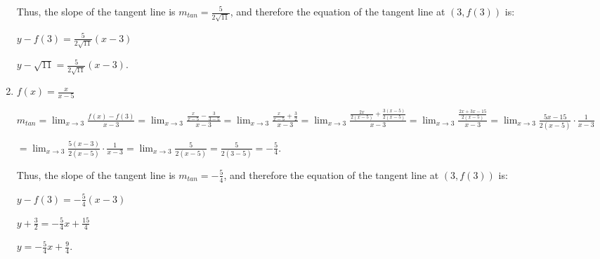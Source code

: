 \documentclass[nooutcomes]{ximera}
\begin{document}
\begin{problem}
\begin{enumerate}
\begin{freeResponse}
		Thus, the slope of the tangent line is $m_{tan}=\frac{5}{2\sqrt{11}}$, and therefore the equation of the tangent line at $(3, f(3))$ is:
		
		$y - f(3) = \frac{5}{2\sqrt{11}}(x-3)$
		
		$y - \sqrt{11} = \frac{5}{2\sqrt{11}}(x - 3).$
		\end{freeResponse}
		
	
	\item  $f(x) = \frac{x}{x-5}$
		\begin{freeResponse}
		$m_{tan} = \lim_{x \to 3} \frac{f(x) - f(3)}{x-3}
		= \lim_{x \to 3} \frac{\frac{x}{x-5} - \frac{3}{3-5}}{x-3}
		= \lim_{x \to 3} \frac{\frac{x}{x-5} + \frac{3}{2}}{x-3}
		= \lim_{x \to 3} \frac{\frac{2x}{2(x-5)} + \frac{3(x-5)}{2(x-5)}}{x-3}
		= \lim_{x \to 3} \frac{\frac{2x + 3x - 15}{2(x-5)}}{x-3}
		= \lim_{x \to 3} \frac{5x-15}{2(x-5)} \cdot \frac{1}{x-3}$
		
		$= \lim_{x \to 3} \frac{5(x-3)}{2(x-5)} \cdot \frac{1}{x-3}
		= \lim_{x \to 3} \frac{5}{2(x-5)}
		= \frac{5}{2(3-5)} = -\frac{5}{4}.$
		
		Thus, the slope of the tangent line is $m_{tan}=- \frac{5}{4}$, and therefore the equation of the tangent line at $(3, f(3))$ is:
		
		$y - f(3) = - \frac{5}{4}(x-3)$
		
		$y + \frac{3}{2} = - \frac{5}{4}x + \frac{15}{4}$
		
		$y = - \frac{5}{4} x + \frac{9}{4}.$
		\end{freeResponse}
		
	
	\end{enumerate}
\end{problem}
\end{document}
